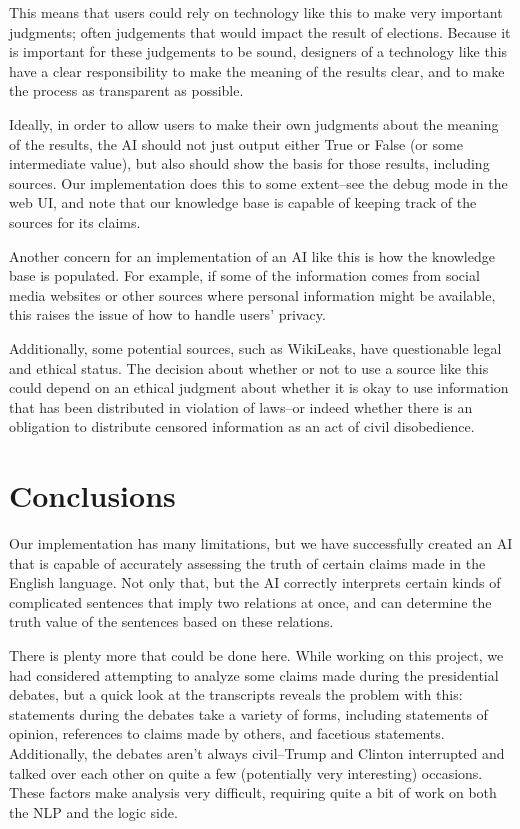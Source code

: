 \documentclass{chi2009}
\begin{document}
This means that users could rely on technology like this to make very important judgments; often judgements that would impact the result of elections.
Because it is important for these judgements to be sound, designers of a technology like this have a clear responsibility to make the meaning of the results clear, and to make the process as transparent as possible.

Ideally, in order to allow users to make their own judgments about the meaning of the results, the AI should not just output either True or False (or some intermediate value), but also should show the basis for those results, including sources.
Our implementation does this to some extent--see the debug mode in the web UI, and note that our knowledge base is capable of keeping track of the sources for its claims.

Another concern for an implementation of an AI like this is how the knowledge base is populated.
For example, if some of the information comes from social media websites or other sources where personal information might be available, this raises the issue of how to handle users' privacy.

Additionally, some potential sources, such as WikiLeaks, have questionable legal and ethical status.
The decision about whether or not to use a source like this could depend on an ethical judgment about whether it is okay to use information that has been distributed in violation of laws--or indeed whether there is an obligation to distribute censored information as an act of civil disobedience.

\section{Conclusions}

Our implementation has many limitations, but we have successfully created an AI that is capable of accurately assessing the truth of certain claims made in the English language. 
Not only that, but the AI correctly interprets certain kinds of complicated sentences that imply two relations at once, and can determine the truth value of the sentences based on these relations.

There is plenty more that could be done here.
While working on this project, we had considered attempting to analyze some claims made during the presidential debates, but a quick look at the transcripts reveals the problem with this: statements during the debates take a variety of forms, including statements of opinion, references to claims made by others, and facetious statements. Additionally, the debates aren't always civil--Trump and Clinton interrupted and talked over each other on quite a few (potentially very interesting) occasions. These factors make analysis very difficult, requiring quite a bit of work on both the NLP and the logic side.
\end{document}
